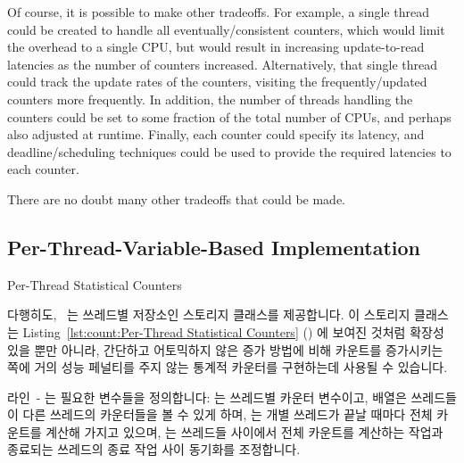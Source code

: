 \begin{lineref}
{	Of course, it is possible to make other tradeoffs.
	For example, a single thread could be created to handle all
	eventually\-/consistent counters, which would limit the
	overhead to a single CPU, but would result in increasing
	update-to-read latencies as the number of counters increased.
	Alternatively, that single thread could track the update rates
	of the counters, visiting the frequently\-/updated counters
	more frequently.
	In addition, the number of threads handling the counters could
	be set to some fraction of the total number of CPUs, and
	perhaps also adjusted at runtime.
	Finally, each counter could specify its latency, and
	deadline\-/scheduling techniques could be used to provide
	the required latencies to each counter.

	There are no doubt many other tradeoffs that could be made.
	\fi
} \QuickQuizEnd

\subsection{Per-Thread-Variable-Based Implementation}
\label{sec:count:Per-Thread-Variable-Based Implementation}
\NoIndentAfterThis

\begin{listing}[tb]

\caption{Per-Thread Statistical Counters}
\label{lst:count:Per-Thread Statistical Counters}
\end{listing}

다행히도, \GCC\ 는 쓰레드별 저장소인  스토리지 클래스를
제공합니다.
이 스토리지 클래스는
Listing~\ref{lst:count:Per-Thread Statistical Counters} ()
에 보여진 것처럼 확장성 있을 뿐만 아니라, 간단하고 어토믹하지 않은 증가 방법에
비해 카운트를 증가시키는 쪽에 거의 성능 페널티를 주지 않는 통계적 카운터를
구현하는데 사용될 수 있습니다.

\begin{lineref}
라인~- 는 필요한 변수들을 정의합니다:  는
쓰레드별 카운터 변수이고,  배열은 쓰레드들이 다른 쓰레드의
카운터들을 볼 수 있게 하며,  는 개별 쓰레드가 끝날 때마다 전체
카운트를 계산해 가지고 있으며,  는 쓰레드들 사이에서 전체
카운트를 계산하는 작업과 종료되는 쓰레드의 종료 작업 사이 동기화를 조정합니다.
\iffalse


\end{lineref}
\end{lineref}
